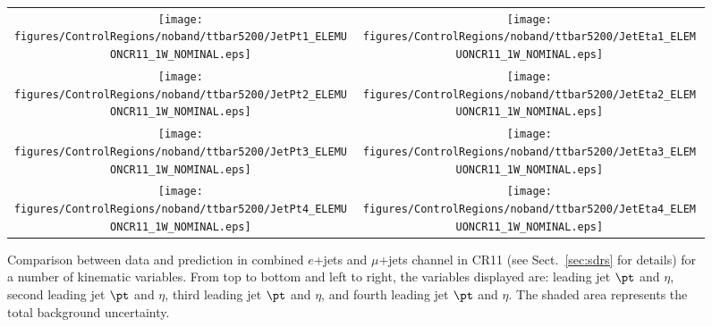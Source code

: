 \clearpage
\begin{figure}[htbp]
\begin{center}
\begin{tabular}{cc}
%
\texttt{[image: figures/ControlRegions/noband/ttbar5200/JetPt1\_ELEMUONCR11\_1W\_NOMINAL.eps]} &
\texttt{[image: figures/ControlRegions/noband/ttbar5200/JetEta1\_ELEMUONCR11\_1W\_NOMINAL.eps]} \\
\texttt{[image: figures/ControlRegions/noband/ttbar5200/JetPt2\_ELEMUONCR11\_1W\_NOMINAL.eps]} &
\texttt{[image: figures/ControlRegions/noband/ttbar5200/JetEta2\_ELEMUONCR11\_1W\_NOMINAL.eps]} \\
\texttt{[image: figures/ControlRegions/noband/ttbar5200/JetPt3\_ELEMUONCR11\_1W\_NOMINAL.eps]} &
\texttt{[image: figures/ControlRegions/noband/ttbar5200/JetEta3\_ELEMUONCR11\_1W\_NOMINAL.eps]} \\
\texttt{[image: figures/ControlRegions/noband/ttbar5200/JetPt4\_ELEMUONCR11\_1W\_NOMINAL.eps]}  &
\texttt{[image: figures/ControlRegions/noband/ttbar5200/JetEta4\_ELEMUONCR11\_1W\_NOMINAL.eps]}  \\
\end{tabular}\caption{\small {Comparison between data and prediction in combined $e$+jets and $\mu$+jets channel in CR11 (see Sect.~\ref{sec:sdrs} for details) 
for a number of kinematic variables. From top to bottom and left to right, the variables displayed are: leading jet $\pt$ and $\eta$,  second leading jet $\pt$ and $\eta$,
third leading jet $\pt$ and $\eta$, and fourth leading jet $\pt$ and $\eta$. The shaded area represents the total background uncertainty.}}
\label{fig:ELEMUONCR11_2}
\end{center}
\end{figure}                                                                             

